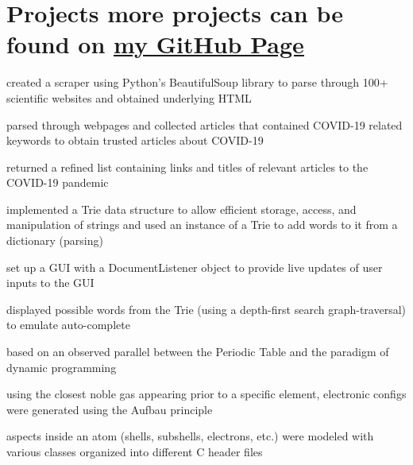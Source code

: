 \section{Projects \small{more projects can be found on \href{https://www.github.com/isobarbaric}{\underline{my GitHub Page}}}}

\begin{tightemize}
\item created a scraper using Python's BeautifulSoup library to parse through 100+ scientific websites and obtained underlying HTML
\item parsed through webpages and collected articles that contained COVID-19 related keywords to obtain trusted articles about COVID-19
\item returned a refined list containing links and titles of relevant articles to the COVID-19 pandemic
\end{tightemize}
\sectionsep

\begin{tightemize}
\item implemented a Trie data structure to allow efficient storage, access, and manipulation of strings and used an instance of a Trie to add words to it from a dictionary (parsing)
\item set up a GUI with a DocumentListener object to provide live updates of user inputs to the GUI
\item displayed possible words from the Trie (using a depth-first search graph-traversal) to emulate auto-complete 
\end{tightemize}
\sectionsep

\begin{tightemize}
\item based on an observed parallel between the Periodic Table and the paradigm of dynamic programming
\item using the closest noble gas appearing prior to a specific element, electronic configs were generated using the Aufbau principle
\item aspects inside an atom (shells, subshells, electrons, etc.) were modeled with various classes organized into different C header files 
\end{tightemize}
\sectionsep
